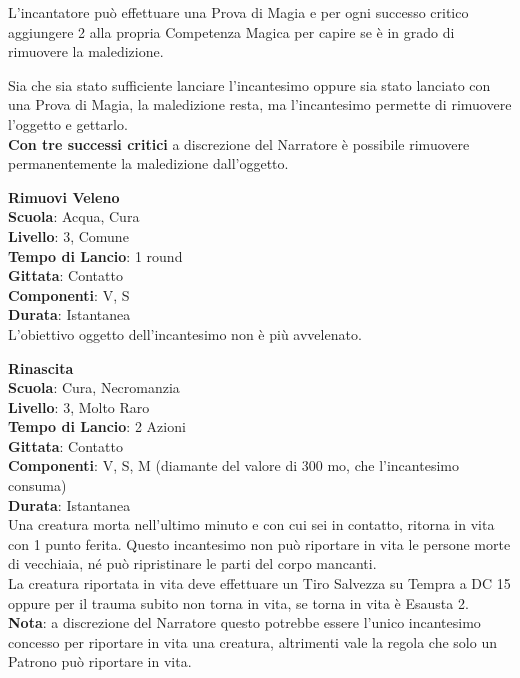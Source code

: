 \begin{multicols}{2}
L'incantatore può effettuare una Prova di Magia e per ogni successo critico aggiungere 2 alla propria Competenza Magica per capire se è in grado di rimuovere la maledizione.

Sia che sia stato sufficiente lanciare l'incantesimo oppure sia stato lanciato con una Prova di Magia, la maledizione resta, ma l'incantesimo permette di rimuovere l'oggetto e gettarlo.\\
\textbf{Con tre successi critici} a discrezione del Narratore è possibile rimuovere permanentemente la maledizione dall'oggetto.

\medskip\textbf{Rimuovi Veleno}\\
\textbf{Scuola}: Acqua, Cura\\
\textbf{Livello}: 3, Comune\\
\textbf{Tempo di Lancio}: 1 round\\
\textbf{Gittata}: Contatto\\
\textbf{Componenti}: V, S\\
\textbf{Durata}: Istantanea\\
L'obiettivo oggetto dell'incantesimo non è più avvelenato.

\medskip\textbf{Rinascita}\\
\textbf{Scuola}: Cura, Necromanzia\\
\textbf{Livello}: 3, Molto Raro\\
\textbf{Tempo di Lancio}: 2 Azioni\\
\textbf{Gittata}: Contatto\\
\textbf{Componenti}: V, S, M (diamante del valore di 300 mo, che l'incantesimo consuma)\\
\textbf{Durata}: Istantanea\\
Una creatura morta nell'ultimo minuto e con cui sei in contatto, ritorna in vita con 1 punto ferita. Questo incantesimo non può riportare in vita le persone morte di vecchiaia, né può ripristinare le parti del corpo mancanti.\\
La creatura riportata in vita deve effettuare un Tiro Salvezza su Tempra a DC 15 oppure per il trauma subito non torna in vita, se torna in vita è Esausta 2.\\
\textbf{Nota}: a discrezione del Narratore questo potrebbe essere l'unico incantesimo concesso per riportare in vita una creatura, altrimenti vale la regola che solo un Patrono può riportare in vita.


\end{multicols}
